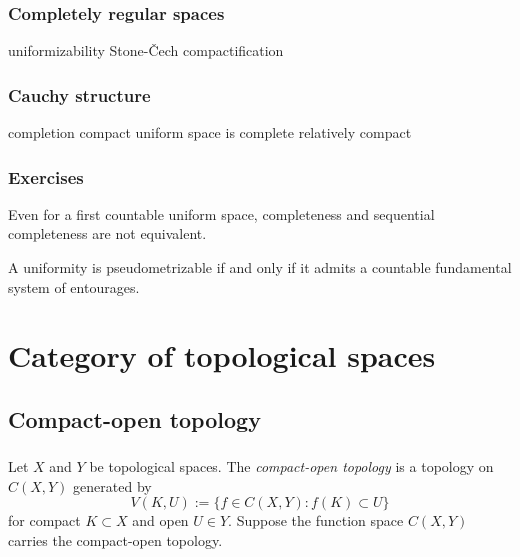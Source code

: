 \documentclass{../../large}
\begin{document}
\section{Completely regular spaces}
uniformizability
Stone-\v Cech compactification

\section{Cauchy structure}
completion
compact uniform space is complete
relatively compact

\section*{Exercises}
\begin{prb}
Even for a first countable uniform space, completeness and sequential completeness are not equivalent.
\end{prb}
\begin{prb}
A uniformity is pseudometrizable if and only if it admits a countable fundamental system of entourages.
\end{prb}



\chapter{}





\part{Category of topological spaces}



\chapter{Compact-open topology}

\section{}

\begin{prb}
Let $X$ and $Y$ be topological spaces.
The \emph{compact-open topology} is a topology on $C(X,Y)$ generated by
\[V(K,U):=\{f\in C(X,Y):f(K)\subset U\}\]
for compact $K\subset X$ and open $U\in Y$.
Suppose the function space $C(X,Y)$ carries the compact-open topology.
\end{prb}
\end{document}
